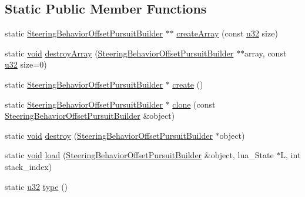 \subsection*{Static Public Member Functions}
\begin{DoxyCompactItemize}
\item 
static \mbox{\hyperlink{classnjli_1_1_steering_behavior_offset_pursuit_builder}{Steering\+Behavior\+Offset\+Pursuit\+Builder}} $\ast$$\ast$ \mbox{\hyperlink{classnjli_1_1_steering_behavior_offset_pursuit_builder_a8d8beab0ad8ff0ef55f0cb3e3904d97c}{create\+Array}} (const \mbox{\hyperlink{_util_8h_a10e94b422ef0c20dcdec20d31a1f5049}{u32}} size)
\item 
static \mbox{\hyperlink{_thread_8h_af1e856da2e658414cb2456cb6f7ebc66}{void}} \mbox{\hyperlink{classnjli_1_1_steering_behavior_offset_pursuit_builder_a06985bc631aceb9ffaadbcdbe3fca0a2}{destroy\+Array}} (\mbox{\hyperlink{classnjli_1_1_steering_behavior_offset_pursuit_builder}{Steering\+Behavior\+Offset\+Pursuit\+Builder}} $\ast$$\ast$array, const \mbox{\hyperlink{_util_8h_a10e94b422ef0c20dcdec20d31a1f5049}{u32}} size=0)
\item 
static \mbox{\hyperlink{classnjli_1_1_steering_behavior_offset_pursuit_builder}{Steering\+Behavior\+Offset\+Pursuit\+Builder}} $\ast$ \mbox{\hyperlink{classnjli_1_1_steering_behavior_offset_pursuit_builder_abe51855a818a72218385ae592ca05a80}{create}} ()
\item 
static \mbox{\hyperlink{classnjli_1_1_steering_behavior_offset_pursuit_builder}{Steering\+Behavior\+Offset\+Pursuit\+Builder}} $\ast$ \mbox{\hyperlink{classnjli_1_1_steering_behavior_offset_pursuit_builder_ac17b77c260ac5c1b03ff2cafc215bd3b}{clone}} (const \mbox{\hyperlink{classnjli_1_1_steering_behavior_offset_pursuit_builder}{Steering\+Behavior\+Offset\+Pursuit\+Builder}} \&object)
\item 
static \mbox{\hyperlink{_thread_8h_af1e856da2e658414cb2456cb6f7ebc66}{void}} \mbox{\hyperlink{classnjli_1_1_steering_behavior_offset_pursuit_builder_a0d9c714c1aed28d8cb6b5285e5196d2b}{destroy}} (\mbox{\hyperlink{classnjli_1_1_steering_behavior_offset_pursuit_builder}{Steering\+Behavior\+Offset\+Pursuit\+Builder}} $\ast$object)
\item 
static \mbox{\hyperlink{_thread_8h_af1e856da2e658414cb2456cb6f7ebc66}{void}} \mbox{\hyperlink{classnjli_1_1_steering_behavior_offset_pursuit_builder_a804f4cc91a9c6b0845b7cb34d2a09840}{load}} (\mbox{\hyperlink{classnjli_1_1_steering_behavior_offset_pursuit_builder}{Steering\+Behavior\+Offset\+Pursuit\+Builder}} \&object, lua\+\_\+\+State $\ast$L, int stack\+\_\+index)
\item 
static \mbox{\hyperlink{_util_8h_a10e94b422ef0c20dcdec20d31a1f5049}{u32}} \mbox{\hyperlink{classnjli_1_1_steering_behavior_offset_pursuit_builder_a375489c6cd998b80d1283fa838384f12}{type}} ()
\end{DoxyCompactItemize}

